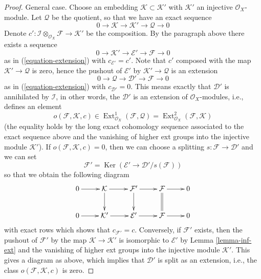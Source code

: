 \documentclass{stacks-project}
\theoremstyle{plain}
\theoremstyle{definition}
\theoremstyle{remark}
\numberwithin{equation}{subsection}
\def\Ext{\mathop{\mathrm{Ext}}\nolimits}
\def\Ker{\mathop{\mathrm{Ker}}}
\begin{document}
\begin{proof}
\medskip\noindent
General case. Choose an embedding $\mathcal{K} \subset \mathcal{K}'$
with $\mathcal{K}'$ an injective $\mathcal{O}_X$-module. Let $\mathcal{Q}$
be the quotient, so that we have an exact sequence
$$
0 \to \mathcal{K} \to \mathcal{K}' \to \mathcal{Q} \to 0
$$
Denote
$c' : \mathcal{I} \otimes_{\mathcal{O}_X} \mathcal{F} \to \mathcal{K}'$
be the composition. By the paragraph above there exists a sequence
$$
0 \to \mathcal{K}' \to \mathcal{E}' \to \mathcal{F} \to 0
$$
as in (\ref{equation-extension}) with $c_{\mathcal{E}'} = c'$.
Note that $c'$ composed with the map $\mathcal{K}' \to \mathcal{Q}$
is zero, hence the pushout of $\mathcal{E}'$ by
$\mathcal{K}' \to \mathcal{Q}$ is an extension
$$
0 \to \mathcal{Q} \to \mathcal{D}' \to \mathcal{F} \to 0
$$
as in (\ref{equation-extension}) with $c_{\mathcal{D}'} = 0$.
This means exactly that $\mathcal{D}'$ is annihilated by
$\mathcal{I}$, in other words, the $\mathcal{D}'$ is an extension
of $\mathcal{O}_X$-modules, i.e., defines an element
$$
o(\mathcal{F}, \mathcal{K}, c) \in
\Ext^1_{\mathcal{O}_X}(\mathcal{F}, \mathcal{Q}) =
\Ext^2_{\mathcal{O}_X}(\mathcal{F}, \mathcal{K})
$$
(the equality holds by the long exact cohomology sequence associated
to the exact sequence above and the vanishing of higher ext groups
into the injective module $\mathcal{K}'$). If
$o(\mathcal{F}, \mathcal{K}, c) = 0$, then we can choose a splitting
$s : \mathcal{F} \to \mathcal{D}'$ and we can set
$$
\mathcal{F}' = \Ker(\mathcal{E}' \to \mathcal{D}'/s(\mathcal{F}))
$$
so that we obtain the following diagram
$$
\xymatrix{
0 \ar[r] &
\mathcal{K} \ar[r] \ar[d] &
\mathcal{F}' \ar[r] \ar[d] &
\mathcal{F} \ar[r] \ar@{=}[d] &
0 \\
0 \ar[r] &
\mathcal{K}' \ar[r] &
\mathcal{E}' \ar[r] &
\mathcal{F} \ar[r] & 0
}
$$
with exact rows which shows that $c_{\mathcal{F}'} = c$. Conversely, if
$\mathcal{F}'$ exists, then the pushout of $\mathcal{F}'$ by the map
$\mathcal{K} \to \mathcal{K}'$ is isomorphic to $\mathcal{E}'$ by
Lemma \ref{lemma-inf-ext} and the vanishing of higher ext groups
into the injective module $\mathcal{K}'$. This gives a diagram
as above, which implies that $\mathcal{D}'$ is split as an extension, i.e.,
the class $o(\mathcal{F}, \mathcal{K}, c)$ is zero.
\end{proof}
\end{document}
